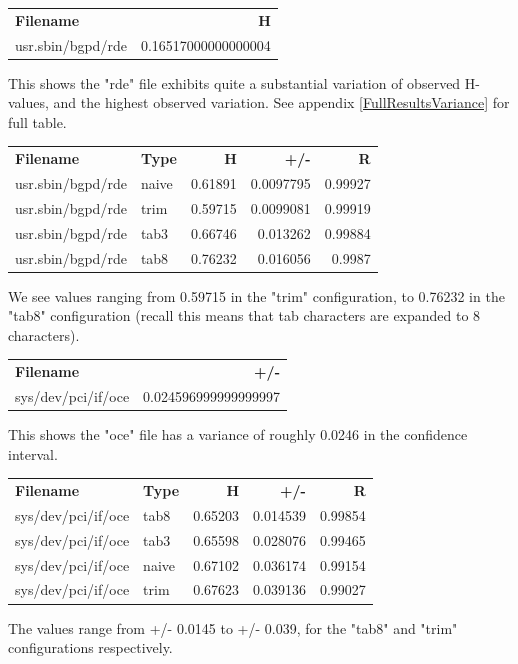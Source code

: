 \documentclass[12pt]{article}
\begin{document}
\begin{longtable}{l r}
\textbf{Filename} &  \textbf{H} \\

{usr.sbin/bgpd/rde} & 0.16517000000000004  \\
\end{longtable}
This shows the "rde" file exhibits quite a substantial variation of observed H-values, and the highest observed variation.  See appendix \ref{FullResultsVariance} for full table. 
\begin{longtable}{l l r r r}
\textbf{Filename} & \textbf{Type} & \textbf{H} & \textbf{+/-} & \textbf{R} \\

{usr.sbin/bgpd/rde} & naive & 0.61891 & 0.0097795 & 0.99927 \\
{usr.sbin/bgpd/rde} & trim & 0.59715 & 0.0099081 & 0.99919 \\
{usr.sbin/bgpd/rde} & tab3 & 0.66746 & 0.013262 & 0.99884 \\
{usr.sbin/bgpd/rde} & tab8 & 0.76232 & 0.016056 & 0.9987 \\
\end{longtable}
We see values ranging from 0.59715 in the "trim" configuration, to 0.76232 in the "tab8" configuration (recall this means that tab characters are expanded to 8 characters).


\begin{longtable}{l r}
\textbf{Filename} &  \textbf{+/-} \\
{sys/dev/pci/if/oce} & 0.024596999999999997  \\
\end{longtable}
This shows the "oce" file has a variance of roughly 0.0246 in the confidence interval.

\begin{longtable}{l l r r r}
\textbf{Filename} & \textbf{Type} & \textbf{H} & \textbf{+/-} & \textbf{R} \\
{sys/dev/pci/if/oce} & tab8 & 0.65203 & 0.014539 & 0.99854 \\
{sys/dev/pci/if/oce} & tab3 & 0.65598 & 0.028076 & 0.99465 \\
{sys/dev/pci/if/oce} & naive & 0.67102 & 0.036174 & 0.99154 \\
{sys/dev/pci/if/oce} & trim & 0.67623 & 0.039136 & 0.99027 \\
\end{longtable}
The values range from +/- 0.0145 to +/- 0.039, for the "tab8" and "trim" configurations respectively.
\end{document}
